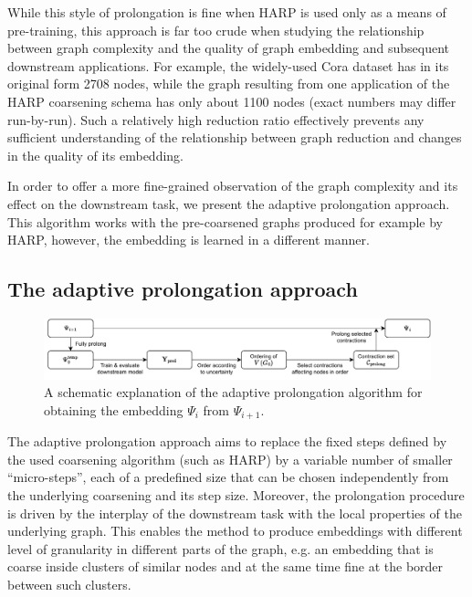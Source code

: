 While this style of prolongation is fine when HARP is used only as a means of pre-training, this approach is far too crude when studying the relationship between graph complexity and the quality of graph embedding and subsequent downstream applications. For example, the widely-used Cora dataset \cite{yang_revisiting_2016} has in its original form 2708 nodes, while the graph resulting from one application of the HARP coarsening schema has only about 1100 nodes (exact numbers may differ run-by-run). Such a relatively high reduction ratio effectively prevents any sufficient understanding of the relationship between graph reduction and changes in the quality of its embedding.

In order to offer a more fine-grained observation of the graph complexity and its effect on the downstream task, we present the adaptive prolongation approach. This algorithm works with the pre-coarsened graphs produced for example by HARP, however, the embedding is learned in a different manner.

\subsection{The adaptive prolongation approach}\label{sec:adaptive-prolongation}

\begin{figure}
  \centering
  \includegraphics[width=\textwidth]{images/adaptive-prolongation/adaptive-prolongation.pdf}
    \caption{A schematic explanation of the adaptive prolongation algorithm for obtaining the embedding \( \Psi_{i} \) from \( \Psi_{i + 1} \).}
  \label{fig:adaptive-prolongation}
\end{figure}

The adaptive prolongation approach aims to replace the fixed steps defined by the used coarsening algorithm (such as HARP) by a variable number of smaller \enquote{micro-steps}, each of a predefined size that can be chosen independently from the underlying coarsening and its step size. Moreover, the prolongation procedure is driven by the interplay of the downstream task with the local properties of the underlying graph. This enables the method to produce embeddings with different level of granularity in different parts of the graph, e.g. an embedding that is coarse inside clusters of similar nodes and at the same time fine at the border between such clusters.

